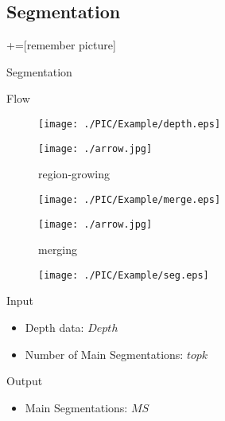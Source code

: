 \documentclass[xcolor=table,compress,blue]{beamer}
\begin{document}
\subsection{Segmentation}
\label{ALG-SEG}
+=[remember picture] %
\begin{frame}{Segmentation}
	\begin{exampleblock}{Flow}
		\begin{figure}[htpb]
			\centering
			\begin{minipage}[b]{0.8in}
				\centerline{ \texttt{[image: ./PIC/Example/depth.eps]} }
			\end{minipage}
			\begin{minipage}[b]{0.8in}
				\centerline{ \texttt{[image: ./arrow.jpg]} }
				\centerline{\tiny{region-growing}}
			\end{minipage}
			\begin{minipage}[b]{0.8in}
				\centerline{ \texttt{[image: ./PIC/Example/merge.eps]} }
			\end{minipage}
			\begin{minipage}[b]{0.8in}
				\centerline{ \texttt{[image: ./arrow.jpg]} }
				\centerline{\tiny{merging}}
			\end{minipage}
			\begin{minipage}[b]{0.8in}
				\centerline{ \texttt{[image: ./PIC/Example/seg.eps]} }
			\end{minipage}
		\end{figure}
	\end{exampleblock}
	\begin{exampleblock}{Input}
		\begin{itemize}		
			\item  Depth data: $Depth$
			\item  Number of Main Segmentations: ${topk}$
		\end{itemize}
	\end{exampleblock}
	\begin{exampleblock}{Output}
		\begin{itemize}		
			\item  Main Segmentations: ${MS}$
		\end{itemize}
	\end{exampleblock}
\end{frame}
\end{document}
